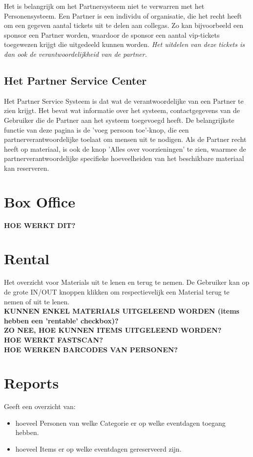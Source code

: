 \documentclass[]{memoir}
\begin{document}
Het is belangrijk om het Partnersysteem niet te verwarren met het Personensysteem. Een Partner is een individu of organisatie, die het recht heeft om een gegeven aantal tickets uit te delen aan collegas. Zo kan bijvoorbeeld een sponsor een Partner worden, waardoor de sponsor een aantal vip-tickets toegewezen krijgt die uitgedeeld kunnen worden. \textsl{Het uitdelen van deze tickets is dan ook de verantwoordelijkheid van de partner.}

\subsection{Het Partner Service Center} \label{PSC}
Het Partner Service Systeem is dat wat de verantwoordelijke van een Partner te zien krijgt. Het bevat wat informatie over het systeem, contactgegevens van de Gebruiker die de Partner aan het systeem toegevoegd heeft.
De belangrijkste functie van deze pagina is de 'voeg persoon toe'-knop, die een partnerverantwoordelijke toelaat om mensen uit te nodigen. Als de Partner recht heeft op materiaal, is ook de knop 'Alles over voorzieningen' te zien, waarmee de partnerverantwoordelijke specifieke hoeveelheiden van het beschikbare materiaal kan reserveren.

\section{Box Office} \label{Box Office}
\textbf{HOE WERKT DIT?}

\section{Rental} \label{Rental}
Het overzicht voor Materials uit te lenen en terug te nemen. De Gebruiker kan op de grote IN/OUT knoppen klikken om respectievelijk een Material terug te nemen of uit te lenen. \\
\textbf{KUNNEN ENKEL MATERIALS UITGELEEND WORDEN (items hebben een 'rentable' checkbox)?} \\
\textbf{ZO NEE, HOE KUNNEN ITEMS UITGELEEND WORDEN?} \\
\textbf{HOE WERKT FASTSCAN?} \\
\textbf{HOE WERKEN BARCODES VAN PERSONEN?} \\

\section{Reports} \label{Reports}
Geeft een overzicht van:
\begin{itemize}
	\item  hoeveel Personen van welke Categorie er op welke eventdagen toegang hebben.
	\item  hoeveel Items er op welke eventdagen gereserveerd zijn.
\end{itemize}
\end{document}
